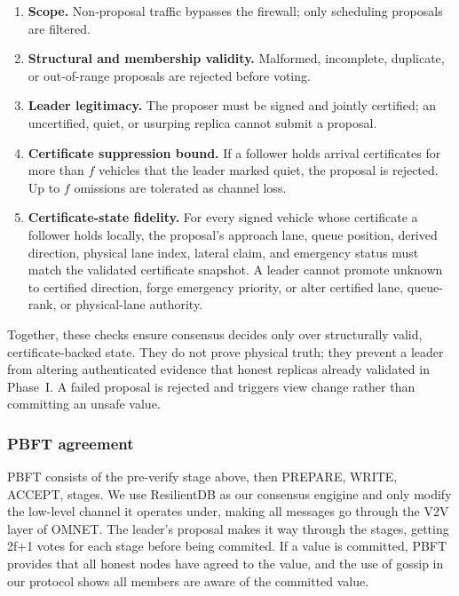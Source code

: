 \documentclass[letterpaper,10pt,conference]{IEEEtran}
\begin{document}
\begin{enumerate}
  \item \textbf{Scope.} Non-proposal traffic bypasses the firewall; only scheduling proposals are filtered.
  \item \textbf{Structural and membership validity.} Malformed, incomplete, duplicate, or out-of-range proposals are rejected before voting.
  \item \textbf{Leader legitimacy.} The proposer must be signed and jointly certified; an uncertified, quiet, or usurping replica cannot submit a proposal.
  \item \textbf{Certificate suppression bound.} If a follower holds arrival certificates for more than $f$ vehicles that the leader marked quiet, the proposal is rejected. Up to $f$ omissions are tolerated as channel loss.
  \item \textbf{Certificate-state fidelity.} For every signed vehicle whose certificate a follower holds locally, the proposal's approach lane, queue position, derived direction, physical lane index, lateral claim, and emergency status must match the validated certificate snapshot. A leader cannot promote unknown to certified direction, forge emergency priority, or alter certified lane, queue-rank, or physical-lane authority.
\end{enumerate}

Together, these checks ensure consensus decides only over structurally valid, certificate-backed state. They do not prove physical truth; they prevent a leader from altering authenticated evidence that honest replicas already validated in Phase~I. A failed proposal is rejected and triggers view change rather than committing an unsafe value.






\subsubsection{PBFT agreement}

PBFT consists of the pre-verify stage above, then PREPARE, WRITE, ACCEPT, stages. We use ResilientDB as our consensus engigine and only modify the low-level channel it operates under, making all messages go through the V2V layer of OMNET. The leader's proposal makes it way through the stages, getting 2f+1 votes for each stage before being commited. If a value is committed, PBFT provides that all honest nodes have agreed to the value, and the use of gossip in our protocol shows all members are aware of the committed value. 
\end{document}

